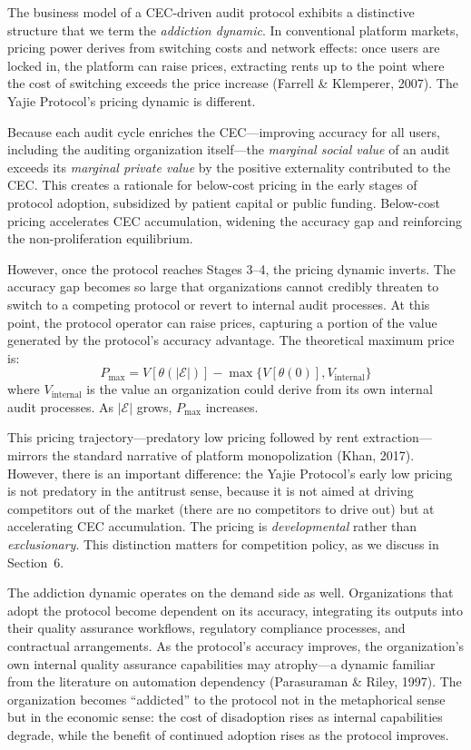 \documentclass[12pt,a4paper]{ctexart}
\theoremstyle{definition}
\theoremstyle{remark}
\begin{document}
The business model of a CEC-driven audit protocol exhibits a distinctive structure that we term the \textit{addiction dynamic}. In conventional platform markets, pricing power derives from switching costs and network effects: once users are locked in, the platform can raise prices, extracting rents up to the point where the cost of switching exceeds the price increase (Farrell \& Klemperer, 2007). The Yajie Protocol's pricing dynamic is different.

Because each audit cycle enriches the CEC—improving accuracy for all users, including the auditing organization itself—the \textit{marginal social value} of an audit exceeds its \textit{marginal private value} by the positive externality contributed to the CEC. This creates a rationale for below-cost pricing in the early stages of protocol adoption, subsidized by patient capital or public funding. Below-cost pricing accelerates CEC accumulation, widening the accuracy gap and reinforcing the non-proliferation equilibrium.

However, once the protocol reaches Stages 3–4, the pricing dynamic inverts. The accuracy gap becomes so large that organizations cannot credibly threaten to switch to a competing protocol or revert to internal audit processes. At this point, the protocol operator can raise prices, capturing a portion of the value generated by the protocol's accuracy advantage. The theoretical maximum price is:
\begin{equation}
P_{\max} = V[\theta(|\mathcal{E}|)] - \max\{V[\theta(0)], V_{\text{internal}}\}
\end{equation}
where $V_{\text{internal}}$ is the value an organization could derive from its own internal audit processes. As $|\mathcal{E}|$ grows, $P_{\max}$ increases.

This pricing trajectory—predatory low pricing followed by rent extraction—mirrors the standard narrative of platform monopolization (Khan, 2017). However, there is an important difference: the Yajie Protocol's early low pricing is not predatory in the antitrust sense, because it is not aimed at driving competitors out of the market (there are no competitors to drive out) but at accelerating CEC accumulation. The pricing is \textit{developmental} rather than \textit{exclusionary}. This distinction matters for competition policy, as we discuss in Section~6.

The addiction dynamic operates on the demand side as well. Organizations that adopt the protocol become dependent on its accuracy, integrating its outputs into their quality assurance workflows, regulatory compliance processes, and contractual arrangements. As the protocol's accuracy improves, the organization's own internal quality assurance capabilities may atrophy—a dynamic familiar from the literature on automation dependency (Parasuraman \& Riley, 1997). The organization becomes ``addicted'' to the protocol not in the metaphorical sense but in the economic sense: the cost of disadoption rises as internal capabilities degrade, while the benefit of continued adoption rises as the protocol improves.
\end{document}
